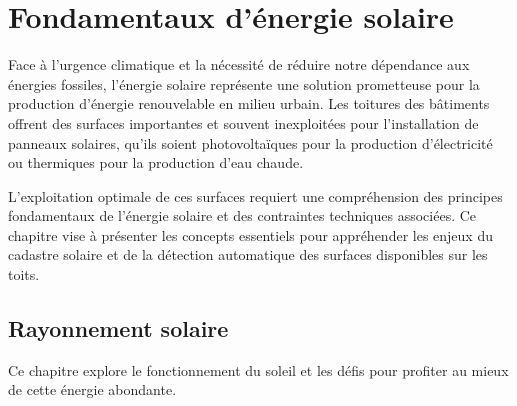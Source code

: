 \chapter{Fondamentaux d'énergie solaire}
\label{chap:fondamentaux_energie}

\par{Face à l'urgence climatique et la nécessité de réduire notre dépendance aux énergies fossiles, l'énergie solaire représente une solution prometteuse pour la production d'énergie renouvelable en milieu urbain. Les toitures des bâtiments offrent des surfaces importantes et souvent inexploitées pour l'installation de panneaux solaires, qu'ils soient photovoltaïques pour la production d'électricité ou thermiques pour la production d'eau chaude.}

\par{L'exploitation optimale de ces surfaces requiert une compréhension des principes fondamentaux de l'énergie solaire et des contraintes techniques associées. Ce chapitre vise à présenter les concepts essentiels pour appréhender les enjeux du cadastre solaire et de la détection automatique des surfaces disponibles sur les toits.}

\localtableofcontents

\newpage

\section{Rayonnement solaire}

\par{Ce chapitre explore le fonctionnement du soleil et les défis pour profiter au mieux de cette énergie abondante.}

